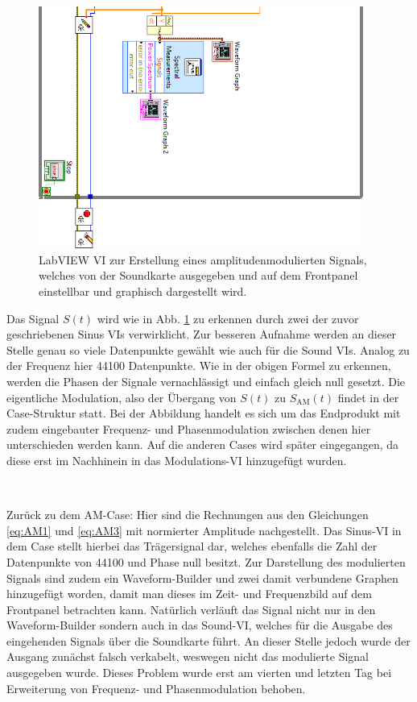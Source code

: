 		\begin{figure}[H]
			\centering
			\includegraphics[width=0.95\textwidth]{pic/am2.png}
			\caption{LabVIEW VI zur Erstellung eines amplitudenmodulierten Signals, welches von der Soundkarte ausgegeben und auf dem Frontpanel einstellbar und graphisch dargestellt wird.}
			\label{fig:am}	
		\end{figure} 
		
		\thispagestyle{empty}
		Das Signal $S(t)$ wird wie in Abb. \ref{fig:am} zu erkennen durch zwei der zuvor geschriebenen Sinus VIs verwirklicht.
		Zur besseren Aufnahme werden an dieser Stelle genau so viele Datenpunkte gewählt wie auch für die Sound VIs. 
		Analog zu der Frequenz hier 44100 Datenpunkte.
		Wie in der obigen Formel zu erkennen, werden die Phasen der Signale vernachlässigt und einfach gleich null gesetzt.
		Die eigentliche Modulation, also der Übergang von $S(t)$ zu $S_\text{AM}(t)$ findet in der Case-Struktur statt.
		Bei der Abbildung handelt es sich um das Endprodukt mit zudem eingebauter Frequenz- und Phasenmodulation zwischen denen hier unterschieden werden kann.
		Auf die anderen Cases wird später eingegangen, da diese erst im Nachhinein in das Modulations-VI hinzugefügt wurden.
			
		\
		
		Zurück zu dem AM-Case: Hier sind die Rechnungen aus den Gleichungen \ref{eq:AM1} und \ref{eq:AM3} mit normierter Amplitude nachgestellt.
		Das Sinus-VI in dem Case stellt hierbei das Trägersignal dar, welches ebenfalls die Zahl der Datenpunkte von 44100 und Phase null besitzt.
		Zur Darstellung des modulierten Signals sind zudem ein Waveform-Builder und zwei damit verbundene Graphen hinzugefügt worden, damit man dieses im Zeit- und Frequenzbild auf dem Frontpanel betrachten kann.
		Natürlich verläuft das Signal nicht nur in den Waveform-Builder sondern auch in das Sound-VI, welches für die Ausgabe des eingehenden Signals über die Soundkarte führt.
		An dieser Stelle jedoch wurde der Ausgang zunächst falsch verkabelt, weswegen nicht das modulierte Signal ausgegeben wurde.
		Dieses Problem wurde erst am vierten und letzten Tag bei Erweiterung von Frequenz- und Phasenmodulation behoben.
			
